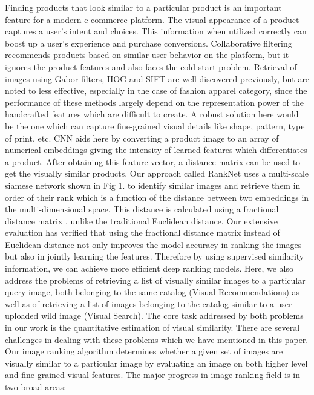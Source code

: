 \documentclass[10pt,twocolumn,letterpaper]{article}
\begin{document}
Finding products that look similar to a particular product is an important feature for a modern e-commerce platform. The visual appearance of a product captures a user’s intent and choices. This information when utilized correctly can boost up a user’s experience and purchase conversions. Collaborative filtering recommends products based on similar user behavior on the platform, but it ignores the product features and also faces the cold-start problem. Retrieval of images using Gabor filters, HOG \cite{c1} and SIFT \cite{c2} are well discovered previously, but are noted to less effective, especially in the case of fashion apparel category, since the performance of these methods largely depend on the representation power of the handcrafted features which are difficult to create. A robust solution here would be the one which can capture fine-grained visual details like shape, pattern, type of print, etc. CNN aids here by converting a product image to an array of numerical embeddings giving the intensity of learned features which differentiates a product. After obtaining this feature vector, a distance matrix can be used to get the visually similar products.
Our approach called RankNet uses a multi-scale siamese network shown in Fig 1. to identify similar images and retrieve them in order of their rank which is a function of the distance between two embeddings in the multi-dimensional space. This distance is calculated using a fractional distance matrix \cite{c3}, unlike the traditional Euclidean distance. Our extensive evaluation has verified that using the fractional distance matrix instead of Euclidean distance not only improves the model accuracy in ranking the images but also in jointly learning the features. Therefore by using supervised similarity information, we can achieve more efficient deep ranking models.
Here, we also address the problems of retrieving a list of visually similar images to a particular query image, both belonging to the same catalog (Visual Recommendations) as well as of retrieving a list of images belonging to the catalog similar to a user-uploaded wild image (Visual Search). The core task addressed by both problems in our work is the quantitative estimation of visual similarity. There are several challenges in dealing with these problems which we have mentioned in this paper. Our image ranking algorithm determines whether a given set of images are visually similar to a particular image by evaluating an image on both higher level and fine-grained visual features. The major progress in image ranking field is in two broad areas: \\
\end{document}
